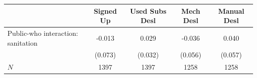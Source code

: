 \begin{tabular}{lcccc}
\hline\hline
 & Signed Up & Used Subs Desl & Mech Desl & Manual Desl \\
\hline
Public-who interaction: sanitation & -0.013 & 0.029 & -0.036 & 0.040 \\
 & (0.073) & (0.032) & (0.056) & (0.057) \\
\hline
$N$ & 1397 & 1397 & 1258 & 1258 \\
\hline\hline
\end{tabular}
